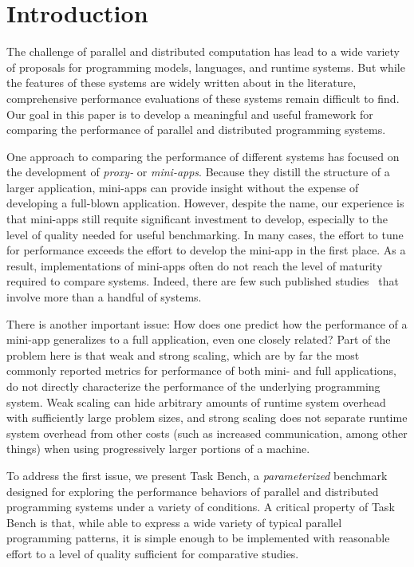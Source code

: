 \section{Introduction}
\label{sec:introduction}

The challenge of parallel and distributed computation has lead to a
wide variety of proposals for programming models, languages, and
runtime systems. But while the features of these systems are widely
written about in the literature, comprehensive performance evaluations
of these systems remain difficult to find. Our
goal in this paper is to develop a meaningful and useful framework for
comparing the performance of parallel and distributed programming
systems.



One approach to comparing the performance of different systems has
focused on the development of \emph{proxy-} or
\emph{mini-apps}. Because they distill the structure of a larger
application, mini-apps can provide insight
without the expense of developing a full-blown
application. However, despite the name, our experience is that
mini-apps still requite significant investment to develop, especially
to the level of quality needed for useful benchmarking. In many cases,
the effort to tune for performance exceeds the effort to develop the
mini-app in the first place. As a result, implementations of mini-apps
often do not reach the level of maturity required to compare
systems. Indeed, there are few such published studies~\cite{LULESH13, PRK14, NAS95}
that involve more than a handful of systems.

There is another important issue: How does one predict how
the performance of a mini-app generalizes to a full
application, even one closely related? Part of the problem here is
that weak and strong scaling, which are by far the most commonly
reported metrics for performance of both mini- and full applications,
do not directly characterize the performance of the underlying
programming system. Weak scaling can hide arbitrary amounts of runtime
system overhead with sufficiently large problem sizes, and strong
scaling does not separate runtime system overhead from other costs
(such as increased communication, among other things) when
using progressively larger portions of a machine.

To address the first issue, we present Task Bench, a
\emph{parameterized} benchmark designed for exploring the performance
behaviors of parallel and distributed programming systems under a
variety of conditions. A critical property of Task Bench is that,
while able to express a wide variety of typical parallel programming
patterns, it is simple enough to be implemented with reasonable effort
to a level of quality sufficient for comparative studies.

